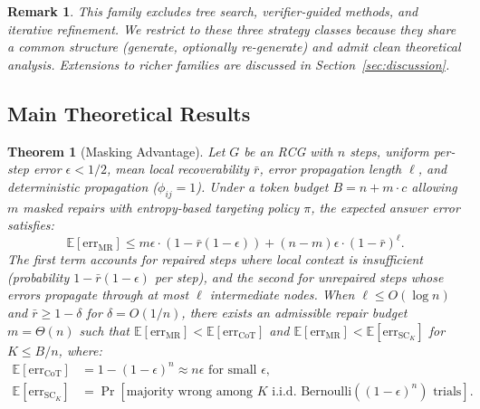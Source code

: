 \documentclass{article}
\newtheorem{theorem}{Theorem}
\newtheorem{remark}{Remark}
\begin{document}
\begin{remark}
This family excludes tree search, verifier-guided methods, and iterative refinement. We restrict to these three strategy classes because they share a common structure (generate, optionally re-generate) and admit clean theoretical analysis. Extensions to richer families are discussed in Section~\ref{sec:discussion}.
\end{remark}

\subsection{Main Theoretical Results}

\begin{theorem}[Masking Advantage]
\label{thm:masking}
Let $G$ be an RCG with $n$ steps, uniform per-step error $\epsilon < 1/2$, mean local recoverability $\bar{r}$, error propagation length $\ell$, and deterministic propagation ($\phi_{ij} = 1$). Under a token budget $B = n + m \cdot c$ allowing $m$ masked repairs with entropy-based targeting policy $\pi$, the expected answer error satisfies:
\begin{equation}
\mathbb{E}[\text{err}_{\text{MR}}] \leq m\epsilon \cdot \left(1 - \bar{r}(1 - \epsilon)\right) + (n - m)\epsilon \cdot (1 - \bar{r})^{\ell}.
\label{eq:masking_bound}
\end{equation}
The first term accounts for repaired steps where local context is insufficient (probability $1 - \bar{r}(1-\epsilon)$ per step), and the second for unrepaired steps whose errors propagate through at most $\ell$ intermediate nodes.
When $\ell \leq O(\log n)$ and $\bar{r} \geq 1 - \delta$ for $\delta = O(1/n)$, there exists an admissible repair budget $m = \Theta(n)$ such that $\mathbb{E}[\text{err}_{\text{MR}}] < \mathbb{E}[\text{err}_{\text{CoT}}]$ and $\mathbb{E}[\text{err}_{\text{MR}}] < \mathbb{E}[\text{err}_{\text{SC}_K}]$ for $K \leq B/n$, where:
\begin{align}
\mathbb{E}[\text{err}_{\text{CoT}}] &= 1 - (1-\epsilon)^n \approx n\epsilon \text{ for small } \epsilon, \\
\mathbb{E}[\text{err}_{\text{SC}_K}] &= \Pr[\text{majority wrong among } K \text{ i.i.d.\ Bernoulli}((1-\epsilon)^n) \text{ trials}].
\end{align}
\end{theorem}
\end{document}
